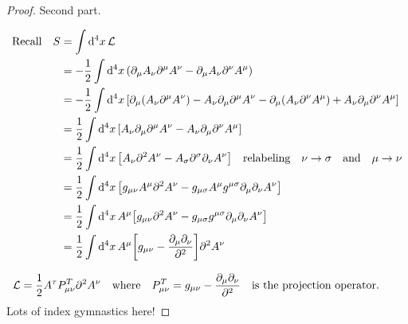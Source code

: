 \documentclass[letterpaper]{article}
\theoremstyle{definition}
\begin{document}
\begin{proof}Second part.

  \begin{align*}
    \qq*{Recall} S & =\int\dd[4]{x}\mathcal {L}                                                                                                                                                                       \\
                   & =-\frac{1}{2}\int\dd[4]{x}\pqty{\partial_\mu A_\nu \partial^\mu A^\nu -\partial_\mu A_\nu \partial^\nu A^\mu}                                                                                    \\
                   & =-\frac{1}{2}\int\dd[4]{x}\bqty{\partial_\mu (A_\nu \partial^\mu A^\nu) - A_\nu \partial_\mu\partial^\mu A^\nu - \partial_\mu (A_\nu \partial^\nu A^\mu) + A_\nu \partial_\mu\partial^\nu A^\mu} \\
                   & =\frac{1}{2}\int\dd[4]{x}\bqty{A_\nu \partial_\mu\partial^\mu A^\nu - A_\nu \partial_\mu\partial^\nu A^\mu}                                                                                      \\
                   & =\frac{1}{2}\int\dd[4]{x}\bqty{A_\nu \partial^2 A^\nu - A_\sigma \partial^\sigma\partial_\nu A^\nu}\qq{relabeling}\nu\rightarrow\sigma \qand  \mu\rightarrow\nu                                  \\
                   & =\frac{1}{2}\int\dd[4]{x}\bqty{g_{\mu\nu} A^\mu \partial^2 A^\nu - g_{\mu\sigma}A^\mu g^{\mu\sigma}\partial_\mu\partial_\nu A^\nu}                                                               \\
                   & =\frac{1}{2}\int\dd[4]{x}A^\mu\bqty{g_{\mu\nu}  \partial^2 A^\nu - g_{\mu\sigma} g^{\mu\sigma}\partial_\mu\partial_\nu A^\nu}                                                                    \\
                   & =\frac{1}{2}\int\dd[4]{x}A^\mu\bqty{g_{\mu\nu}  - \frac{\partial_\mu\partial_\nu}{\partial^2} } \partial^2 A^\nu                                                                                 \\
  \end{align*}

  \begin{align*}
    \mathcal{L} & =\frac{1}{2}A^\tau P^T_{\mu\nu}\partial^2 A^\nu\qq{where}P^T_{\mu\nu}=g_{\mu\nu}  - \frac{\partial_\mu\partial_\nu}{\partial^2} \qq{is the projection operator.}
  \end{align*}
  Lots of index gymnastics here!
\end{proof}
\end{document}
